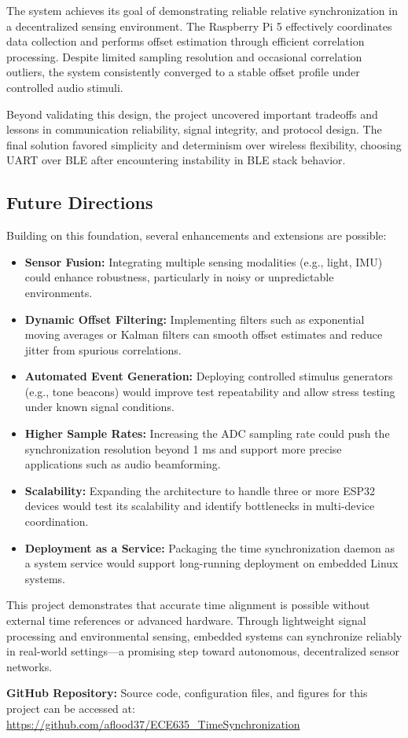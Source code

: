 \documentclass[sigconf]{acmart}
\begin{document}
The system achieves its goal of demonstrating reliable relative synchronization in a decentralized sensing environment. The Raspberry Pi 5 effectively coordinates data collection and performs offset estimation through efficient correlation processing. Despite limited sampling resolution and occasional correlation outliers, the system consistently converged to a stable offset profile under controlled audio stimuli.

Beyond validating this design, the project uncovered important tradeoffs and lessons in communication reliability, signal integrity, and protocol design. The final solution favored simplicity and determinism over wireless flexibility, choosing UART over BLE after encountering instability in BLE stack behavior.

\subsection{Future Directions}
Building on this foundation, several enhancements and extensions are possible:
\begin{itemize}
    \item \textbf{Sensor Fusion:} Integrating multiple sensing modalities (e.g., light, IMU) could enhance robustness, particularly in noisy or unpredictable environments.
    \item \textbf{Dynamic Offset Filtering:} Implementing filters such as exponential moving averages or Kalman filters can smooth offset estimates and reduce jitter from spurious correlations.
    \item \textbf{Automated Event Generation:} Deploying controlled stimulus generators (e.g., tone beacons) would improve test repeatability and allow stress testing under known signal conditions.
    \item \textbf{Higher Sample Rates:} Increasing the ADC sampling rate could push the synchronization resolution beyond 1 ms and support more precise applications such as audio beamforming.
    \item \textbf{Scalability:} Expanding the architecture to handle three or more ESP32 devices would test its scalability and identify bottlenecks in multi-device coordination.
    \item \textbf{Deployment as a Service:} Packaging the time synchronization daemon as a system service would support long-running deployment on embedded Linux systems.
\end{itemize}

This project demonstrates that accurate time alignment is possible without external time references or advanced hardware. Through lightweight signal processing and environmental sensing, embedded systems can synchronize reliably in real-world settings—a promising step toward autonomous, decentralized sensor networks.

\noindent\textbf{GitHub Repository:} Source code, configuration files, and figures for this project can be accessed at: \\ \url{https://github.com/aflood37/ECE635_TimeSynchronization}




\end{document}
